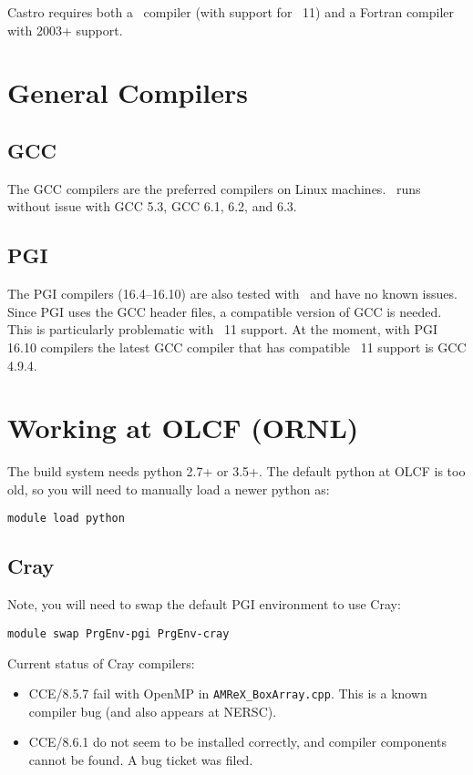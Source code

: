 Castro requires both a \cpp\ compiler (with support for \cpp\ 11) and
a Fortran compiler with 2003+ support.

\section{General Compilers}

\subsection{GCC}
The GCC compilers are the preferred compilers on Linux machines.
\castro\ runs without issue with GCC 5.3, GCC 6.1, 6.2, and 6.3.

\subsection{PGI}

The PGI compilers (16.4--16.10) are also tested with \castro\ and have
no known issues.  Since PGI uses the GCC header files, a compatible
version of GCC is needed.  This is particularly problematic with \cpp~11
support.  At the moment, with PGI 16.10 compilers the latest GCC compiler
that has compatible \cpp~11 support is GCC 4.9.4.

\section{Working at OLCF (ORNL)}

The build system needs python 2.7+ or 3.5+.  The default python at OLCF
is too old, so you will need to manually load a newer python as:
\begin{verbatim}
module load python
\end{verbatim}

\subsection{Cray}
Note, you will need to swap the default PGI environment to use Cray:
\begin{verbatim}
module swap PrgEnv-pgi PrgEnv-cray
\end{verbatim}

Current status of Cray compilers:
\begin{itemize}
\item CCE/8.5.7 fail with OpenMP in {\tt AMReX\_BoxArray.cpp}.  This is a known compiler bug
  (and also appears at NERSC).
\item CCE/8.6.1 do not seem to be installed correctly, and compiler
  components cannot be found.  A bug ticket was filed.
\end{itemize}

